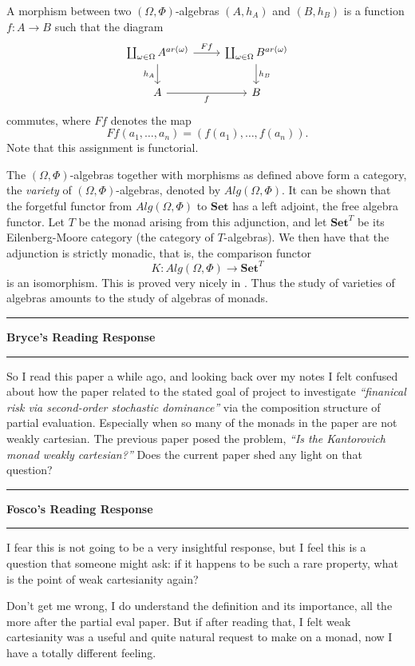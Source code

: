 \documentclass{amsart}
\newcommand{\iam}[1]{
  \vspace{0.25em}
  \hrule
  \vspace{0.25em}
  \textbf{{#1}'s Reading Response}
  \vspace{0.25em}
  \hrule
  \vspace{1em}
}
\begin{document}
A morphism between two $(\Omega,\Phi)$-algebras $(A,h_A)$ and $(B,h_B)$ is a function $f:A\rightarrow B$ such that the diagram
\begin{equation*}
\begin{tikzcd}
\coprod_{\omega\in\Omega} A^{ar(\omega)}
\arrow[r, "Ff"]
\arrow[d, "h_A"']
& \coprod_{\omega\in\Omega} B^{ar(\omega)}
\arrow[d, "h_B"]
\\
A
\arrow[r, "f"']
& B
\end{tikzcd}
\end{equation*}
commutes, where $Ff$ denotes the map
$$Ff(a_1,\dots,a_n) = (f(a_1),\dots,f(a_n)).$$
Note that this assignment is functorial.

The $(\Omega,\Phi)$-algebras together with morphisms as defined above form a category, the {\em variety} of $(\Omega,\Phi)$-algebras, denoted by $Alg(\Omega,\Phi)$. It can be shown that the forgetful functor from $Alg(\Omega,\Phi)$ to $\mathbf{Set}$ has a left adjoint, the free algebra functor. Let $T$ be the monad arising from this adjunction, and let $\mathbf{Set}^T$ be its Eilenberg-Moore category (the category of $T$-algebras). We then have that the adjunction is strictly monadic, that is, the comparison functor
$$K : Alg(\Omega,\Phi)\rightarrow\mathbf{Set}^T$$
is an isomorphism. This is proved very nicely in \cite{Voutas}. Thus the study of varieties of algebras amounts to the study of algebras of monads.

\iam{Bryce}

So I read this paper a while ago, and looking back over my notes I felt confused
about how the paper related to the stated goal of project to investigate
\emph{``finanical risk via second-order stochastic dominance''} via the composition
structure of partial evaluation. Especially when so many of the monads in the paper
are not weakly cartesian.
The previous paper posed the problem, \emph{``Is the Kantorovich monad weakly cartesian?''} Does the current paper shed any light on that question?

\iam{Fosco}

I fear this is not going to be a very insightful response, but I feel this is a question that someone might ask: if it happens to be such a rare property, what is the point of weak cartesianity again?

Don't get me wrong, I do understand the definition and its importance, all the more after the partial eval paper. But if after reading that, I felt weak cartesianity was a useful and quite natural request to make on a monad, now I have a totally different feeling.
\end{document}
